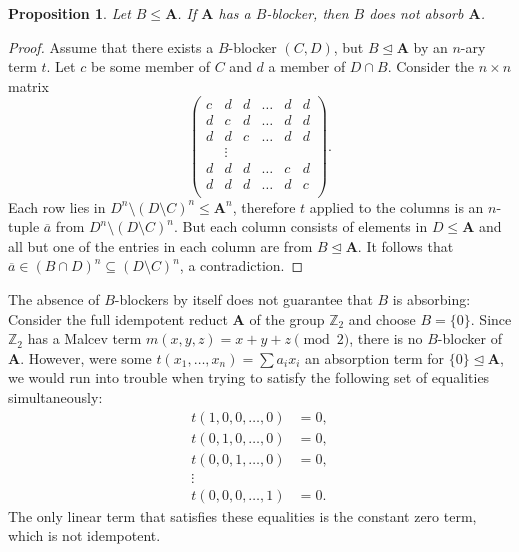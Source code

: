 \documentclass{amsart}
\theoremstyle{plain}
\newtheorem{proposition}[theorem]{Proposition}
\theoremstyle{definition}
\begin{document}
\begin{proposition} \label{blocker-noabs}
Let $B \leq {{\mathbf{A}}}$. If ${{\mathbf{A}}}$ has a $B$-blocker, then $B$ does not absorb ${{\mathbf{A}}}$.
\end{proposition}
\begin{proof}
  Assume that there exists a $B$-blocker $(C,D)$, but $B \operatorname{\trianglelefteq} {{\mathbf{A}}}$ by an $n$-ary term $t$. Let $c$ be some
  member of $C$ and $d$ a member of $D\cap B$. Consider the $n \times n$ matrix
\[
  \left(\begin{matrix}
      c&d&d&\dots&d&d\\
      d&c&d&\dots&d&d\\
      d&d&c&\dots&d&d\\
       &\vdots\\
      d&d&d&\dots&c&d\\
      d&d&d&\dots&d&c\\
  \end{matrix}\right).
\]
Each row lies in $D^n \setminus (D \setminus C)^n \leq {{\mathbf{A}}}^n$, therefore $t$ applied to the columns is an $n$-tuple ${\overline{{a}}}$ from $D^n \setminus (D \setminus C)^n$. 
But each column consists of elements in $D \leq {{\mathbf{A}}}$ and all but one of the entries in each column are from $B \operatorname{\trianglelefteq} {{\mathbf{A}}}$. It follows that ${\overline{{a}}} \in (B \cap D)^n \subseteq (D \setminus C)^n$, a contradiction.   
\end{proof}

The absence of $B$-blockers by itself does not guarantee that $B$ is absorbing:
Consider the full idempotent reduct ${{\mathbf{A}}}$ of the group ${{\mathbb Z}}_2$ and choose
$B=\{0\}$. Since ${{\mathbb Z}}_2$ has a Malcev term $m(x,y,z)=x+y+z\pmod 2$, there is
no $B$-blocker of ${{\mathbf{A}}}$. However, were some $t(x_1,\dots,x_n)=\sum a_i x_i$ an absorption term for
$\{0\}\operatorname{\trianglelefteq} {{\mathbf{A}}}$, we would run into trouble when trying to satisfy the
following set of equalities simultaneously:
\begin{align*}
  t(1,0,0,\dots,0)&=0,\\
  t(0,1,0,\dots,0)&=0,\\
  t(0,0,1,\dots,0)&=0,\\
  \vdots\\
  t(0,0,0,\dots,1)&=0.
\end{align*}
The only linear term that satisfies these equalities is the constant zero term, which is not idempotent.
\end{document}

